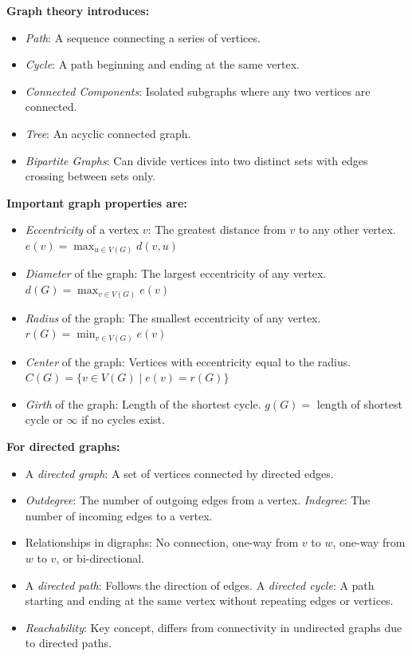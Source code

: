 \documentclass{article}
\begin{document}
\textbf{Graph theory introduces:}
\begin{itemize}
    \item \textit{Path}: A sequence connecting a series of vertices.
    \item \textit{Cycle}: A path beginning and ending at the same vertex.
    \item \textit{Connected Components}: Isolated subgraphs where any two vertices are connected.
    \item \textit{Tree}: An acyclic connected graph.
    \item \textit{Bipartite Graphs}: Can divide vertices into two distinct sets with edges crossing between sets only.
\end{itemize}

\textbf{Important graph properties are:}
\begin{itemize}
    \item \textit{Eccentricity} of a vertex $v$: The greatest distance from $v$ to any other vertex. $e(v) = \max_{u \in V(G)} d(v, u)$
    \item \textit{Diameter} of the graph: The largest eccentricity of any vertex. $d(G) = \max_{v \in V(G)} e(v)$
    \item \textit{Radius} of the graph: The smallest eccentricity of any vertex. $r(G) = \min_{v \in V(G)} e(v)$
    \item \textit{Center} of the graph: Vertices with eccentricity equal to the radius. $C(G) = \{v \in V(G) \mid e(v) = r(G)\}$
    \item \textit{Girth} of the graph: Length of the shortest cycle. $g(G) =$ length of shortest cycle or $\infty$ if no cycles exist.
\end{itemize}

\textbf{For directed graphs:}
\begin{itemize}
    \item A \textit{directed graph}: A set of vertices connected by directed edges.
    \item \textit{Outdegree}: The number of outgoing edges from a vertex. \textit{Indegree}: The number of incoming edges to a vertex.
    \item Relationships in digraphs: No connection, one-way from $v$ to $w$, one-way from $w$ to $v$, or bi-directional.
    \item A \textit{directed path}: Follows the direction of edges. A \textit{directed cycle}: A path starting and ending at the same vertex without repeating edges or vertices.
    \item \textit{Reachability}: Key concept, differs from connectivity in undirected graphs due to directed paths.
\end{itemize}
\end{document}
